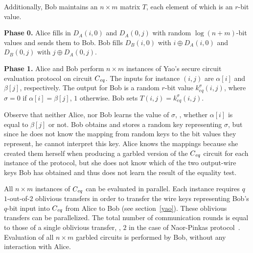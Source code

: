 Additionally, Bob maintains an $n \times m$ matrix $T$, each element of
which is an $r$-bit value.



\vspace{1ex}
\noindent
\textbf{Phase 0.}
Alice fills in $D_A(i,0)$ and $D_A(0,j)$ with random $\log(n+m)$-bit
values and sends them to Bob.  Bob fills $D_B(i,0)$ with $i \oplus D_A(i,0)$
and $D_B(0,j)$ with $j \oplus D_A(0,j)$.

\vspace{1ex}
\noindent
\textbf{Phase 1.}
Alice and Bob perform $n \times m$ instances of Yao's secure circuit
evaluation protocol on circuit $C_{\mathit{eq}}$.  The inputs for instance $(i,j)$
are $\alpha[i]$ and $\beta[j]$, respectively.  The output for Bob is a
random $r$-bit value $k^{\sigma}_{eq} (i,j)$, where $\sigma=0$ if
$\alpha[i]=\beta[j]$, $1$ otherwise.  Bob sets $T(i,j)=k^{\sigma}_{eq} (i,j)$.

Observe that neither Alice, nor Bob learns the value of $\sigma$, \ie,
whether $\alpha[i]$ is equal to $\beta[j]$ or not.  Bob obtains and stores
a random key representing $\sigma$, but since he does not know the mapping
from random keys to the bit values they represent, he cannot interpret
this key.  Alice knows the mappings because she created them herself
when producing a garbled version of the $C_{\mathit{eq}}$ circuit for each instance
of the protocol, but she does not know which of the two output-wire keys
Bob has obtained and thus does not learn the result of the equality test.

All $n \times m$ instances of $C_{\mathit{eq}}$ can be evaluated in parallel.
Each instance requires $q$ $1$-out-of-$2$ oblivious transfers in order
to transfer the wire keys representing Bob's $q$-bit input into $C_{\mathit{eq}}$
from Alice to Bob (see section~\ref{yao}).  These oblivious transfers can
be parallelized.  The total number of communication rounds is equal to
those of a single oblivious transfer, \eg, $2$ in the case of Naor-Pinkas
protocol~\cite{Naor-Pinkas:2001}.  Evaluation of all $n \times m$
garbled circuits is performed by Bob, without any interaction with Alice.



